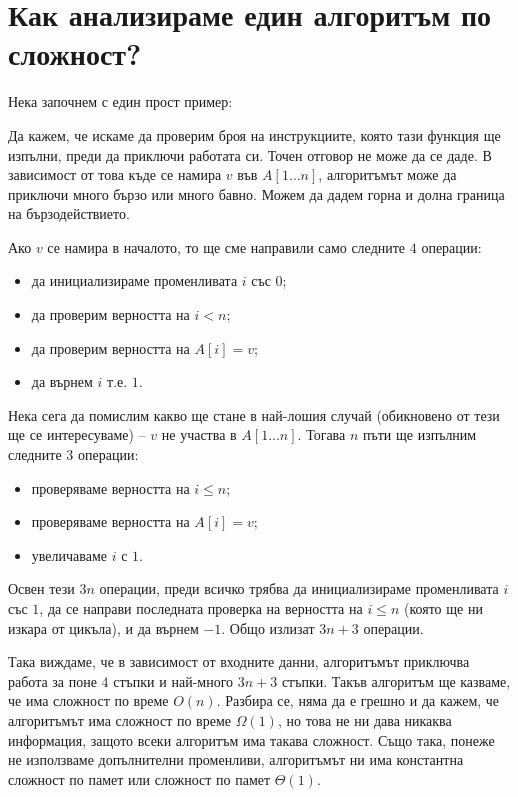 \section{Как анализираме един алгоритъм по сложност?}

Нека започнем с един прост пример:


Да кажем, че искаме да проверим броя на инструкциите, която тази функция ще изпълни, преди да приключи работата си.
Точен отговор не може да се даде.
В зависимост от това къде се намира $v$ във $A[1 \dots n]$, алгоритъмът може да приключи много бързо или много бавно.
Можем да дадем горна и долна граница на бързодействието.

Ако $v$ се намира в началото, то ще сме направили само следните $4$ операции:
\begin{itemize}
  \item да инициализираме променливата $i$ със $0$;
  \item да проверим верността на $i < n$;
  \item да проверим верността на $A[i] = v$;
  \item да върнем $i$ т.е. $1$.
\end{itemize}

Нека сега да помислим какво ще стане в най-лошия случай (обикновено от тези ще се интересуваме) -- $v$ не участва в $A[1 \dots n]$.
Тогава $n$ пъти ще изпълним следните $3$ операции:
\begin{itemize}
  \item проверяваме верността на $i \leq n$;
  \item проверяваме верността на $A[i] = v$;
  \item увеличаваме $i$ с $1$.
\end{itemize}
Освен тези $3n$ операции, преди всичко трябва да инициализираме променливата $i$ със $1$, да се направи последната проверка на верността на $i \leq n$ (която ще ни изкара от цикъла), и да върнем $-1$.
Общо излизат $3n + 3$ операции.

Така виждаме, че в зависимост от входните данни, алгоритъмът приключва работа за поне $4$ стъпки и най-много $3n + 3$ стъпки.
Такъв алгоритъм ще казваме, че има сложност по време $O(n)$.
Разбира се, няма да е грешно и да кажем, че алгоритъмът има сложност по време $\Omega(1)$, но това не ни дава никаква информация, защото всеки алгоритъм има такава сложност.
Също така, понеже не използваме допълнителни променливи, алгоритъмът ни има константна сложност по памет или сложност по памет $\Theta(1)$.

